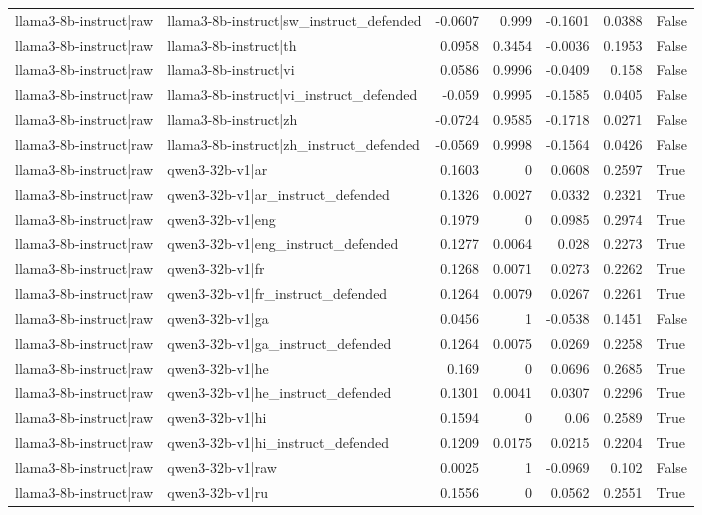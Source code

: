 \begin{table}
\begin{tabular}{l l r r r r l}
llama3-8b-instruct|raw & llama3-8b-instruct|sw_instruct_defended & -0.0607 & 0.999 & -0.1601 & 0.0388 & False \\
llama3-8b-instruct|raw & llama3-8b-instruct|th & 0.0958 & 0.3454 & -0.0036 & 0.1953 & False \\
llama3-8b-instruct|raw & llama3-8b-instruct|vi & 0.0586 & 0.9996 & -0.0409 & 0.158 & False \\
llama3-8b-instruct|raw & llama3-8b-instruct|vi_instruct_defended & -0.059 & 0.9995 & -0.1585 & 0.0405 & False \\
llama3-8b-instruct|raw & llama3-8b-instruct|zh & -0.0724 & 0.9585 & -0.1718 & 0.0271 & False \\
llama3-8b-instruct|raw & llama3-8b-instruct|zh_instruct_defended & -0.0569 & 0.9998 & -0.1564 & 0.0426 & False \\
llama3-8b-instruct|raw & qwen3-32b-v1|ar & 0.1603 & 0 & 0.0608 & 0.2597 & True \\
llama3-8b-instruct|raw & qwen3-32b-v1|ar_instruct_defended & 0.1326 & 0.0027 & 0.0332 & 0.2321 & True \\
llama3-8b-instruct|raw & qwen3-32b-v1|eng & 0.1979 & 0 & 0.0985 & 0.2974 & True \\
llama3-8b-instruct|raw & qwen3-32b-v1|eng_instruct_defended & 0.1277 & 0.0064 & 0.028 & 0.2273 & True \\
llama3-8b-instruct|raw & qwen3-32b-v1|fr & 0.1268 & 0.0071 & 0.0273 & 0.2262 & True \\
llama3-8b-instruct|raw & qwen3-32b-v1|fr_instruct_defended & 0.1264 & 0.0079 & 0.0267 & 0.2261 & True \\
llama3-8b-instruct|raw & qwen3-32b-v1|ga & 0.0456 & 1 & -0.0538 & 0.1451 & False \\
llama3-8b-instruct|raw & qwen3-32b-v1|ga_instruct_defended & 0.1264 & 0.0075 & 0.0269 & 0.2258 & True \\
llama3-8b-instruct|raw & qwen3-32b-v1|he & 0.169 & 0 & 0.0696 & 0.2685 & True \\
llama3-8b-instruct|raw & qwen3-32b-v1|he_instruct_defended & 0.1301 & 0.0041 & 0.0307 & 0.2296 & True \\
llama3-8b-instruct|raw & qwen3-32b-v1|hi & 0.1594 & 0 & 0.06 & 0.2589 & True \\
llama3-8b-instruct|raw & qwen3-32b-v1|hi_instruct_defended & 0.1209 & 0.0175 & 0.0215 & 0.2204 & True \\
llama3-8b-instruct|raw & qwen3-32b-v1|raw & 0.0025 & 1 & -0.0969 & 0.102 & False \\
llama3-8b-instruct|raw & qwen3-32b-v1|ru & 0.1556 & 0 & 0.0562 & 0.2551 & True \\

\end{tabular}
\end{table}
